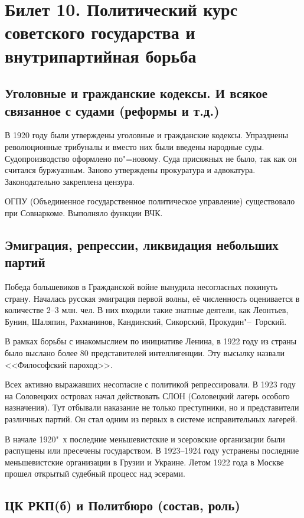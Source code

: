 \section{Билет 10. Политический курс советского государства и внутрипартийная борьба}

\subsection{Уголовные и гражданские кодексы. И всякое связанное с судами (реформы и т.д.)}

В 1920 году были утверждены уголовные и гражданские кодексы. Упразднены революционные трибуналы и вместо них были введены народные суды. Судопроизводство оформлено по"=новому. Суда присяжных не было, так как он считался буржуазным. Заново утверждены прокуратура и адвокатура. Законодательно закреплена цензура. 

ОГПУ (Объединенное государственное политическое управление) существовало при Совнаркоме. Выполняло функции ВЧК.

\subsection{Эмиграция, репрессии, ликвидация небольших партий}

Победа большевиков в Гражданской войне вынудила несогласных покинуть страну. Началась русская эмиграция первой волны, её численность оценивается в количестве 2--3 млн. чел. В них входили такие знатные деятели, как Леонтьев, Бунин, Шаляпин, Рахманинов, Кандинский, Сикорский, Прокудин"--~Горский.

В рамках борьбы с инакомыслием по инициативе Ленина, в 1922 году из страны было выслано более 80 представителей интеллигенции. Эту высылку назвали <<Философский пароход>>.

Всех активно выражавших несогласие с политикой репрессировали. В 1923 году на Соловецких островах начал действовать СЛОН (Соловецкий лагерь особого назначения). Тут отбывали наказание не только преступники, но и представители различных партий. Он стал одним из первых в системе исправительных лагерей.

В начале 1920"~х последние меньшевистские и эсеровские организации были распущены или пресечены государством. В 1923--1924 году устранены последние меньшевистские организации в Грузии и Украине. Летом 1922 года в Москве прошел открытый судебный процесс над эсерами. 

\subsection{ЦК РКП(б) и Политбюро (состав, роль)}

